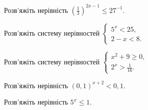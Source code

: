 \documentclass[12pt]{article}
\begin{document}
\begin{samepage}
\noindent\zadnum Розв'яжіть нерівність $\left(\displaystyle\frac{1}{3}\right)^{2x-1} \leqslant 27^{-1}$. 

\nmtnobreak
\answerTable{$[2; +\infty)$}{$[-1; +\infty)$}{$(-\infty; 4]$}{$(-\infty; -1]$}{$(-\infty; 2]$}
\par{}
\end{samepage}

\begin{samepage}
\noindent\zadnum Розв'яжіть систему нерівностей $\begin{cases} 5^x < 25, \\ 2 - x < 8. \end{cases}$ 

\nmtnobreak
{}
\par{}
\end{samepage}

\begin{samepage}
\noindent\zadnum Розв'яжіть систему нерівностей $\begin{cases} x^2 + 9 \geqslant 0, \\ 2^x > \displaystyle\frac{1}{16}. \end{cases}$ 

\nmtnobreak
\answerTable{$[-3; +\infty)$}{$(-4; +\infty)$}{$(-4; -3]$}{$(-4; -3] \cup [3; +\infty)$}{$\varnothing$}
\par{}
\end{samepage}

\begin{samepage}
\noindent\zadnum Розв'яжіть нерівність $(0{,}1)^{x+2} < 0{,}1$. 

\nmtnobreak
{}
\par{}
\end{samepage}

\begin{samepage}
\noindent\zadnum Розв'яжіть нерівність $5^x \leqslant 1$. 

\nmtnobreak
\answerTableTall{$[1; +\infty)$}{$(-\infty; 1]$}{$\left(-\infty; \displaystyle\frac{1}{5}\right)$}{$(-\infty; 0]$}{$[0; +\infty)$}

\nmtnobreak
\par{}\vspace{0.25cm}
\end{samepage}
\end{document}
